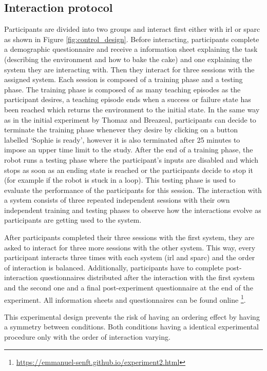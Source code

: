 \subsection{Interaction protocol}

Participants are divided into two groups and interact first either with \gls{irl} or \gls{sparc} as shown in Figure \ref{fig:control_design}. Before interacting, participants complete a demographic questionnaire and receive a information sheet explaining the task (describing the environment and how to bake the cake) and one explaining the system they are interacting with. Then they interact for three sessions with the assigned system. Each session is composed of a training phase and a testing phase. The training phase is composed of as many teaching episodes as the participant desires, a teaching episode ends when a success or failure state has been reached which returns the environment to the initial state. In the same way as in the initial experiment by Thomaz and Breazeal, participants can decide to terminate the training phase whenever they desire by clicking on a button labelled `Sophie is ready', however it is also terminated after 25 minutes to impose an upper time limit to the study. After the end of a training phase, the robot runs a testing phase where the participant's inputs are disabled and which stops as soon as an ending state is reached or the participants decide to stop it (for example if the robot is stuck in a loop). This testing phase is used to evaluate the performance of the participants for this session. The interaction with a system consists of three repeated independent sessions with their own independent training and testing phases to observe how the interactions evolve as participants are getting used to the system.

After participants completed their three sessions with the first system, they are asked to interact for three more sessions with the other system. This way, every participant interacts three times with each system (\gls{irl} and \gls{sparc}) and the order of interaction is balanced. Additionally, participants have to complete post-interaction questionnaires distributed after the interaction with the first system and the second one and a final post-experiment questionnaire at the end of the experiment. All information sheets and questionnaires can be found online \footnote{\url{https://emmanuel-senft.github.io/experiment2.html}}.


This experimental design prevents the risk of having an ordering effect by having a symmetry between conditions. Both conditions having a identical experimental procedure only with the order of interaction varying.

